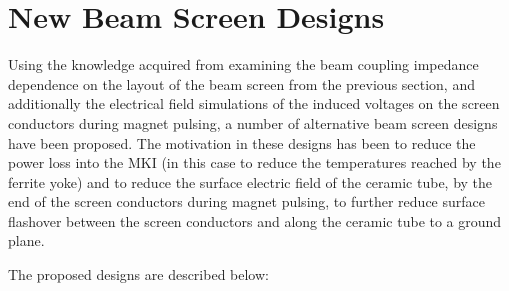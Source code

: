\section{New Beam Screen Designs}

Using the knowledge acquired from examining the beam coupling impedance dependence on the layout of the beam screen from the previous section, and additionally the electrical field simulations of the induced voltages on the screen conductors during magnet pulsing, a number of alternative beam screen designs have been proposed. The motivation in these designs has been to reduce the power loss into the MKI (in this case to reduce the temperatures reached by the ferrite yoke) and to reduce the surface electric field of the ceramic tube, by the end of the screen conductors during magnet pulsing, to further reduce surface flashover between the screen conductors and along the ceramic tube to a ground plane.

The proposed designs are described below:

